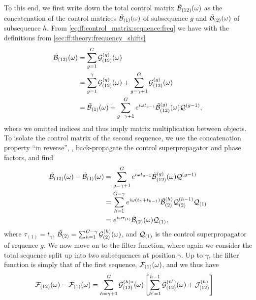 To this end, we first write down the total control matrix $\tilde{\mathcal{B}}_{(12)}(\omega)$ as the concatenation of the control matrices $\tilde{\mathcal{B}}_{(1)}(\omega)$ of subsequence $g$ and $\tilde{\mathcal{B}}_{(2)}(\omega)$ of subsequence $h$.
From \cref{eq:ff:control_matrix:sequence:freq} we have with the definitions from \cref{sec:ff:theory:frequency_shifts}
\begin{align}
    \tilde{\mathcal{B}}_{(12)}(\omega) &= \sum_{g=1}^{G}\mathcal{G}_{(12)}^{(g)}(\omega) \\
                            &= \sum_{g=1}^{\gamma}\mathcal{G}_{(12)}^{(g)}(\omega) + \sum_{g=\gamma+1}^{G}\mathcal{G}_{(12)}^{(g)}(\omega) \\
                            &= \tilde{\mathcal{B}}_{(1)}(\omega) + \sum_{g=\gamma+1}^{G}e^{i\omega t_{g-1}}\tilde{\mathcal{B}}_{(12)}^{(g)}(\omega)\mathcal{Q}^{(g-1)},
\end{align}
where we omitted indices and thus imply matrix multiplication between objects.
To isolate the control matrix of the second sequence, we use the concatenation property \enquote{in reverse}, \ie, back-propagate the control superpropagator \liouvQ and phase factors, and find
\begin{align}
    \tilde{\mathcal{B}}_{(12)}(\omega) - \tilde{\mathcal{B}}_{(1)}(\omega) &= \sum_{g=\gamma+1}^{G}e^{i\omega t_{g-1}}\tilde{\mathcal{B}}_{(12)}^{(g)}(\omega)\mathcal{Q}^{(g-1)} \\
                                                     &= \sum_{h=1}^{G-\gamma}e^{i\omega(t_\gamma + t_{h-1})}\tilde{\mathcal{B}}_{(2)}^{(h)}\mathcal{Q}_{(2)}^{(h-1)}\mathcal{Q}_{(1)} \\
                                                     &= e^{i\omega\tau_{(1)}}\tilde{\mathcal{B}}_{(2)}(\omega)\mathcal{Q}_{(1)},
\end{align}
where $\tau_{(1)} = t_{\gamma}$, $\tilde{\mathcal{B}}_{(2)} = \sum_{h=1}^{G-\gamma}\mathcal{G}_{(2)}^{(h)}(\omega)$, and $\mathcal{Q}_{(1)}$ is the control superpropagator of sequence $g$.
We now move on to the filter function, where again we consider the total sequence split up into two subsequences at position $\gamma$.
Up to $\gamma$, the filter function is simply that of the first sequence, $\mathcal{F}_{(1)}(\omega)$, and we thus have
\begin{align}
    \mathcal{F}_{(12)}(\omega) - \mathcal{F}_{(1)}(\omega) &= \sum_{h=\gamma+1}^{G}\mathcal{G}_{(12)}^{(h)\ast}(\omega)\left[\sum_{h^{\prime}=1}^{h-1}\mathcal{G}_{(12)}^{(h^{\prime})}(\omega) + \mathcal{J}_{(12)}^{(h)}\right]
\end{align}
